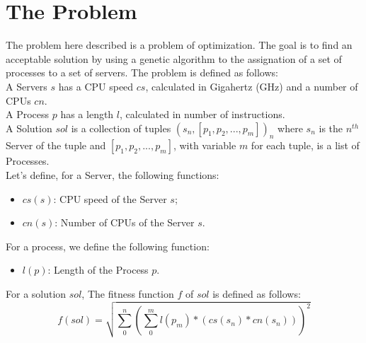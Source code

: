 \section{The Problem}\label{sect:problem}

The problem here described is a problem of optimization. 
The goal is to find an acceptable solution by using a genetic algorithm to the assignation of a set of processes to a set of servers.
The problem is defined as follows:\\
A Servers $s$ has a CPU speed $cs$, calculated in Gigahertz (GHz) and a number of CPUs $cn$.\\
A Process $p$ has a length $l$, calculated in number of instructions.\\
A Solution $sol$ is a collection of tuples $(s_n, [p_1, p_2, ..., p_m])_{n}$ where $s_n$ is the $n^{th}$ Server of the tuple 
and $[p_1, p_2, ..., p_m]$, with variable $m$ for each tuple, is a list of Processes.\\
Let's define, for a Server, the following functions:
\begin{itemize}
    \item $cs(s)$: CPU speed of the Server $s$;
    \item $cn(s)$: Number of CPUs of the Server $s$.\\
\end{itemize}
For a process, we define the following function:
\begin{itemize}
    \item $l(p)$: Length of the Process $p$.\\
\end{itemize}

For a solution $sol$, The fitness function $f$ of $sol$ is defined as follows:
$$f(sol) = \sqrt{\sum_{0}^{n}{(\sum_{0}^{m}l(p_m) * (cs(s_n) * cn(s_n)))^2}}$$
